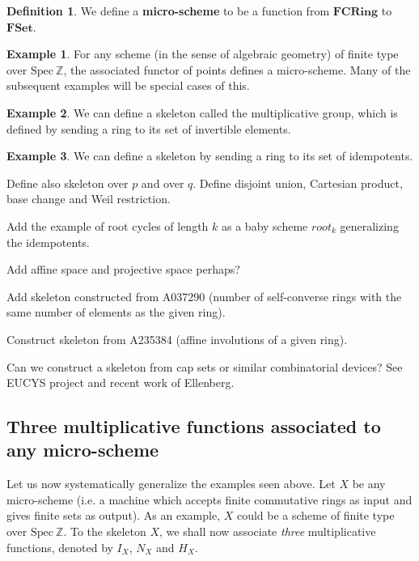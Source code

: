 \documentclass[a4paper]{article}
\theoremstyle{definition}
\newtheorem{definition}{Definition}[section]
\newtheorem{example}{Example}[section]
\theoremstyle{remark}
\newcommand{\Z}{\mathbb{Z}}
\newcommand{\Spec}{\mathrm{Spec}}
\newcommand{\defhl}[1]{\textbf{#1}}
\begin{document}
\begin{definition}
We define a \defhl{micro-scheme} to be a function from $\mathbf{FCRing}$ to $\mathbf{FSet}$.
\end{definition}

\begin{example}
For any scheme (in the sense of algebraic geometry) of finite type over $\Spec \ \Z$, the associated functor of points defines a micro-scheme. Many of the subsequent examples will be special cases of this.
\end{example}

\begin{example}
We can define a skeleton called the multiplicative group, which is defined by sending a ring to its set of invertible elements.
\end{example}


\begin{example}
We can define a skeleton by sending a ring to its set of idempotents.
\end{example}



Define also skeleton over $p$ and over $q$. Define disjoint union, Cartesian product, base change and Weil restriction.

Add the example of root cycles of length $k$ as a baby scheme $root_k$ generalizing the idempotents.

Add affine space and projective space perhaps?

Add skeleton constructed from A037290 (number of self-converse rings with the same number of elements as the given ring). 

Construct skeleton from A235384 (affine involutions of a given ring). 

Can we construct a skeleton from cap sets or similar combinatorial devices? See EUCYS project and recent work of Ellenberg. 


\subsection{Three multiplicative functions associated to any micro-scheme}



Let us now systematically generalize the examples seen above. Let $X$ be any micro-scheme (i.e. a machine which accepts finite commutative rings as input and gives finite sets as output). As an example, $X$ could be a scheme of finite type over $\Spec \ \Z$. To the skeleton $X$, we shall now associate \emph{three} multiplicative functions, denoted by $I_X$, $N_X$ and $H_X$.
\end{document}
